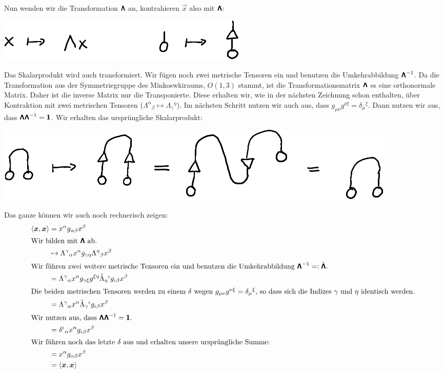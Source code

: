 Nun wenden wir die Transformation $\boldsymbol{\mathsf{\Lambda}}$ an, kontrahieren $\vec x$
also mit $\boldsymbol{\mathsf{\Lambda}}$:
\begin{center}
	\includegraphics{H1-Transformation.pdf}
\end{center}

Das Skalarprodukt wird auch transformiert. Wir fügen noch zwei metrische
Tensoren ein und benutzen die Umkehrabbildung $\boldsymbol{\mathsf{\Lambda}}^{-1}$. Da die
Transformation aus der Symmetriegruppe des Minkoswkiraums, $O(1, 3)$ stammt,
ist die Transformationsmatrix $\boldsymbol{\mathsf{\Lambda}}$ es eine orthonormale Matrix.
Daher ist die inverse Matrix nur die Transponierte. Diese erhalten wir, wie in
der nächsten Zeichnung schon enthalten, über Kontraktion mit zwei metrischen
Tensoren ($\Lambda^\alpha{}_\beta \mapsto \Lambda_\gamma{}^\eta$). Im nächsten
Schritt nutzen wir auch aus, dass $g_{\mu\nu} g^{\nu\xi} = \delta_\mu{}^\xi$.
Dann nutzen wir aus, dass $\boldsymbol{\mathsf{\Lambda}} \boldsymbol{\mathsf{\Lambda}}^{-1} = \boldsymbol{\mathsf{1}}$. Wir
erhalten das ursprüngliche Skalarprodukt:
\begin{center}
	\includegraphics{H1-Invarianz.pdf}
\end{center}

Das ganze können wir auch noch rechnerisch zeigen:
\begin{align*}
	\inner{\vec x}{\vec x}
	&= x^\alpha g_{\alpha \beta} x^\beta \\
	\intertext{Wir bilden mit $\tens \Lambda$ ab.}
	&\mapsto \Lambda^\gamma{}_\alpha x^\alpha g_{\gamma \eta} \Lambda^\eta{}_\beta x^\beta \\
	\intertext{%
		Wir führen zwei weitere metrische Tensoren ein und benutzen die
		Umkehrabbildung $\tens \Lambda^{-1} =: \tilde{\tens \Lambda}$.
	}
	&= \Lambda^\gamma{}_\alpha x^\alpha g_{\gamma \xi} g^{\xi \eta} \tilde\Lambda_\eta{}^\iota g_{\iota\beta} x^\beta \\
	\intertext{%
		Die beiden metrischen Tensoren werden zu einem $\delta$ wegen
		$g_{\mu\nu} g^{\nu\xi} = \delta_\mu{}^\xi$, so dass sich die Indizes
		$\gamma$ und $\eta$ identisch werden.
	}
	&= \Lambda^\gamma{}_\alpha x^\alpha \tilde\Lambda_\gamma{}^\iota g_{\iota\beta} x^\beta \\
	\intertext{%
		Wir nutzen aus, dass $\tens \Lambda \tens \Lambda^{-1} = \tens 1$.
	}
	&= \delta^\iota{}_\alpha x^\alpha g_{\iota\beta} x^\beta \\
	\intertext{%
		Wir führen noch das letzte $\delta$ aus und erhalten unsere
		ursprüngliche Summe:
	}
	&= x^\alpha g_{\alpha\beta} x^\beta \\
	&= \inner{\vec x}{\vec x}
\end{align*}

